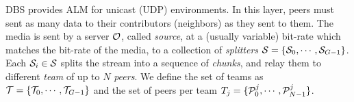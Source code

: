 DBS provides ALM for unicast (UDP) environments. {\color{red} In this
  layer, peers must sent as many data to their contributors
  (neighbors) as they sent to them.} The media is sent by a server
${\cal O}$, called \emph{source}, at a (usually variable) bit-rate
which matches the bit-rate of the media, to a collection of
\emph{splitters} ${\cal S}=\{{\cal S}_0, \cdots, {\cal
  S}_{G-1}\}$. Each ${\cal S}_i \in {\cal S}$ splits the stream into a
sequence of \emph{chunks}, and relay them to different \emph{team} of
up to $N$ \emph{peers}. We define the set of teams as ${\cal
  T}=\{{\cal T}_0,\cdots,{\cal T}_{G-1}\}$ and the set of peers per
team $T_j=\{{\cal P}^j_0,\cdots,{\cal P}^j_{N-1}\}$.


